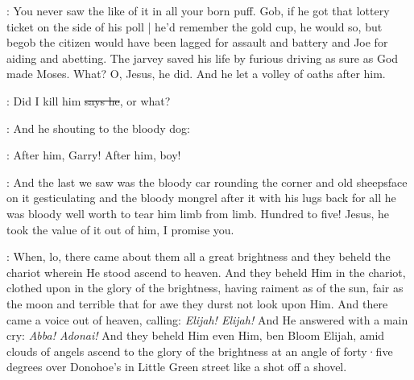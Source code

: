 \Nq:
You never saw the like of it in all your born puff.
Gob,
if he got that lottery ticket on the side of his poll |
he'd remember the gold cup,
he would so,
but begob the citizen would have been lagged for assault
and battery and Joe for aiding and abetting.
The jarvey saved his life
by furious driving as sure as God made Moses.
What?
O, Jesus,
he did.
And he let a volley of oaths after him.

\citizen:
Did I kill him
\sout{says he},
or what?

\Nq:
And he shouting to the bloody dog:

\citizen:
After him,
Garry!
After him,
boy!

\Nq:
And the last we saw was the bloody car rounding the corner and old
sheepsface on it gesticulating and the bloody mongrel after it with his
lugs back for all he was bloody well worth to tear him limb from limb.
Hundred to five!
Jesus,
he took the value of it out of him,
I promise you.

:
When,
lo,
there came about them all a great brightness and they
beheld the chariot wherein He stood ascend to heaven.
And they beheld
Him in the chariot,
clothed upon in the glory of the brightness,
having raiment as of the sun,
fair as the moon and terrible that for awe they
durst not look upon Him.
And there came a voice out of heaven,
calling:
\emph{Elijah!
Elijah!}
And He answered with a main cry:
\emph{Abba!
Adonai!}
And they beheld Him even Him,
ben Bloom Elijah,
amid clouds of angels ascend
to the glory of the brightness at an angle of forty·five degrees over
Donohoe's in Little Green street like a shot off a shovel.

